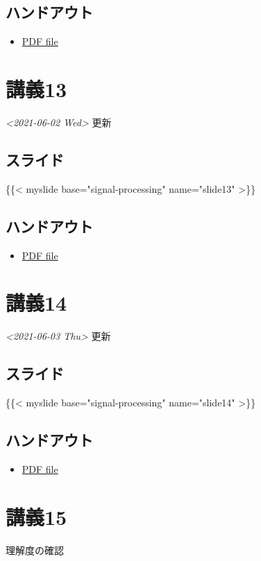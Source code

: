 \documentclass[11pt]{article}
\begin{document}
\subsection{ハンドアウト}
\label{sec:org7c2d168}
\begin{itemize}
\item \href{https://noboru-murata.github.io/signal-processing/pdfs/slide12.pdf}{PDF file}
\end{itemize}

\section{講義13}
\label{sec:org0269dc7}
\textit{<2021-06-02 Wed> } 更新
\subsection{スライド}
\label{sec:orgec1163c}
\{\{< myslide base="signal-processing" name="slide13" >\}\}
\subsection{ハンドアウト}
\label{sec:orgb841726}
\begin{itemize}
\item \href{https://noboru-murata.github.io/signal-processing/pdfs/slide13.pdf}{PDF file}
\end{itemize}

\section{講義14}
\label{sec:org22a2494}
\textit{<2021-06-03 Thu> } 更新
\subsection{スライド}
\label{sec:org29dfc33}
\{\{< myslide base="signal-processing" name="slide14" >\}\}
\subsection{ハンドアウト}
\label{sec:org430154b}
\begin{itemize}
\item \href{https://noboru-murata.github.io/signal-processing/pdfs/slide14.pdf}{PDF file}
\end{itemize}

\section{講義15}
\label{sec:org54c3548}
理解度の確認
\end{document}
